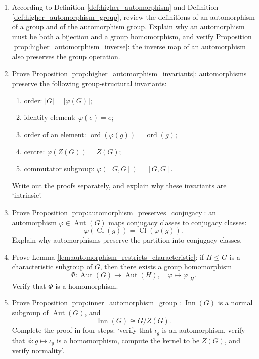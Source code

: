 \begin{enumerate}[leftmargin=3em, label=\textbf{Exercise \arabic*}]
    \item According to Definition \ref{def:higher_automorphism} and Definition \ref{def:higher_automorphism_group},
    review the definitions of an automorphism of a group and of the automorphism group.
    Explain why an automorphism must be both a bijection and a group homomorphism,
    and verify Proposition \ref{prop:higher_automorphism_inverse}:
    the inverse map of an automorphism also preserves the group operation.

    \item Prove Proposition \ref{prop:higher_automorphism_invariants}:
    automorphisms preserve the following group-structural invariants:
    \begin{enumerate}[label=(\roman*)]
        \item order: $|G|=|\varphi(G)|$;
        \item identity element: $\varphi(e)=e$;
        \item order of an element: $\operatorname{ord}(\varphi(g))=\operatorname{ord}(g)$;
        \item centre: $\varphi(Z(G))=Z(G)$;
        \item commutator subgroup: $\varphi([G,G])=[G,G]$.
    \end{enumerate}
    Write out the proofs separately, and explain why these invariants are `intrinsic'.

    \item Prove Proposition \ref{prop:automorphism_preserves_conjugacy}:
    an automorphism $\varphi\in\operatorname{Aut}(G)$ maps conjugacy classes to conjugacy classes:
    \[
    \varphi(\operatorname{Cl}(g))=\operatorname{Cl}(\varphi(g)).
    \]
    Explain why automorphisms preserve the partition into conjugacy classes.

    \item Prove Lemma \ref{lem:automorphism_restricts_characteristic}:
    if $H\le G$ is a characteristic subgroup of $G$, then there exists a group homomorphism
    \[
    \Phi:\operatorname{Aut}(G)\to\operatorname{Aut}(H),\quad \varphi\mapsto\varphi|_H.
    \]
    Verify that $\Phi$ is a homomorphism.

    \item Prove Proposition \ref{prop:inner_automorphism_group}:
    $\operatorname{Inn}(G)$ is a normal subgroup of $\operatorname{Aut}(G)$, and
    \[
    \operatorname{Inn}(G)\cong G/Z(G).
    \]
    Complete the proof in four steps: `verify that $\iota_g$ is an automorphism, verify that $\phi:g\mapsto\iota_g$ is a homomorphism,
    compute the kernel to be $Z(G)$, and verify normality'.


\end{enumerate}
